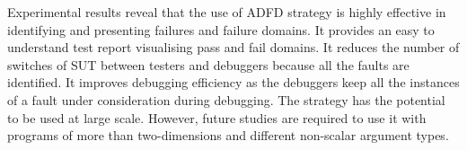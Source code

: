 Experimental results reveal that the use of ADFD strategy is highly effective in identifying and presenting failures and failure domains. It provides an easy to understand test report visualising pass and fail domains. It reduces the number of switches of SUT between testers and debuggers because all the faults are identified. It improves debugging efficiency as the debuggers keep all the instances of a fault under consideration during debugging. The strategy has the potential to be used at large scale. However, future studies are required to use it with programs of more than two-dimensions and different non-scalar argument types.








